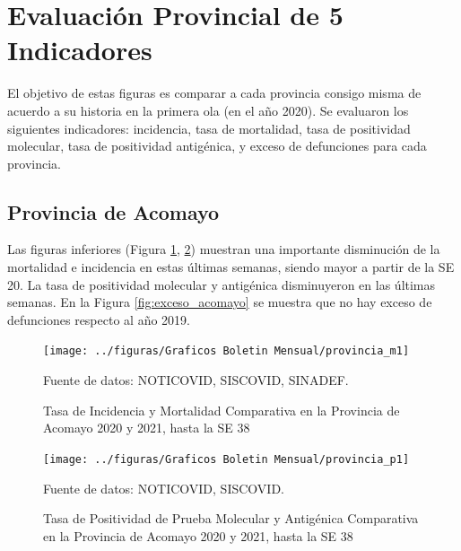 \documentclass[12pt,a4paper,openany]{book}
\begin{document}
	\newpage
	
	\section*{Evaluación Provincial de 5 Indicadores}
	\noindent El objetivo de estas figuras es comparar a cada provincia consigo misma de acuerdo a su historia  en la primera ola (en el año 2020). Se evaluaron los siguientes indicadores: incidencia, tasa de mortalidad, tasa de positividad molecular, tasa de positividad antigénica, y exceso de defunciones para cada provincia.
	
	\subsection*{Provincia de Acomayo}
	\noindent Las figuras inferiores (Figura \ref{fig:inc_mort_acomayo}, \ref{fig:positividad_acomayo}) muestran una importante disminución de la mortalidad e incidencia en estas últimas semanas, siendo mayor a partir de la SE 20. La tasa de positividad molecular y antigénica disminuyeron en las últimas semanas. En la Figura \ref{fig:exceso_acomayo} se muestra que no hay exceso de defunciones respecto al año 2019.
	
	\begin{figure}[h]
		\caption{Tasa de Incidencia y Mortalidad Comparativa en la Provincia de Acomayo 2020 y 2021, hasta la SE 38}\label{fig:inc_mort_acomayo}
		\begin{center}
			\texttt{[image: ../figuras/Graficos Boletin Mensual/provincia\_m1]}
		\end{center}
		{\footnotesize {Fuente de datos: NOTICOVID, SISCOVID, SINADEF.}}
	\end{figure}

	\begin{figure}[h]
	\caption{Tasa de Positividad de Prueba Molecular y Antigénica Comparativa en la Provincia de Acomayo 2020 y 2021, hasta la SE 38}\label{fig:positividad_acomayo}
	\begin{center}
		\texttt{[image: ../figuras/Graficos Boletin Mensual/provincia\_p1]}
	\end{center}
	{\footnotesize {Fuente de datos: NOTICOVID, SISCOVID.}}
	\end{figure}
\end{document}

